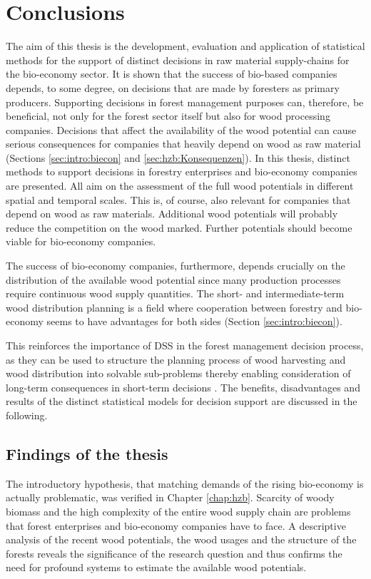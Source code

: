 \chapter{Conclusions}
\label{chap:discussion}
\newpage
\noindent
The aim of this thesis is the development, evaluation and application of statistical methods for the support of distinct decisions in raw material supply-chains for the bio-economy sector. It is shown that the success of bio-based companies depends, to some degree, on decisions that are made by foresters as primary producers. Supporting decisions in forest management purposes can, therefore, be beneficial, not only for the forest sector itself but also for wood processing companies. Decisions that affect the availability of the wood potential can cause serious consequences for companies that heavily depend on wood as raw material (Sections \ref{sec:intro:biecon} and \ref{sec:hzb:Konsequenzen}). In this thesis, distinct methods to support decisions in forestry enterprises and bio-economy companies are presented. All aim on the assessment of the full wood potentials in different spatial and temporal scales. This is, of course, also relevant for companies that depend on wood as raw materials. Additional wood potentials will probably reduce the competition on the wood marked. Further potentials should become viable for bio-economy companies.

The success of bio-economy companies, furthermore, depends crucially on the distribution of the available wood potential since many production processes require continuous wood supply quantities. The short- and intermediate-term wood distribution planning is a field where cooperation between forestry and bio-economy seems to have advantages for both sides (Section \ref{sec:intro:biecon}).

This reinforces the importance of DSS in the forest management decision process, as they can be used to structure the planning process of wood harvesting and wood distribution into solvable sub-problems thereby enabling consideration of long-term consequences in short-term decisions \citep[p. 1065-1067, 1081]{pretzsch_2008}. The benefits, disadvantages and results of the distinct statistical models for decision support are discussed in the following.

\section{Findings of the thesis}
\label{sec:discussion:findings}
The introductory hypothesis, that matching demands of the rising bio-economy is actually problematic, was verified in Chapter \ref{chap:hzb}. Scarcity of woody biomass and the high complexity of the entire wood supply chain are problems that forest enterprises and bio-economy companies have to face. A descriptive analysis of the recent wood potentials, the wood usages and the structure of the forests reveals the significance of the research question and thus confirms the need for profound systems to estimate the available wood potentials. 

